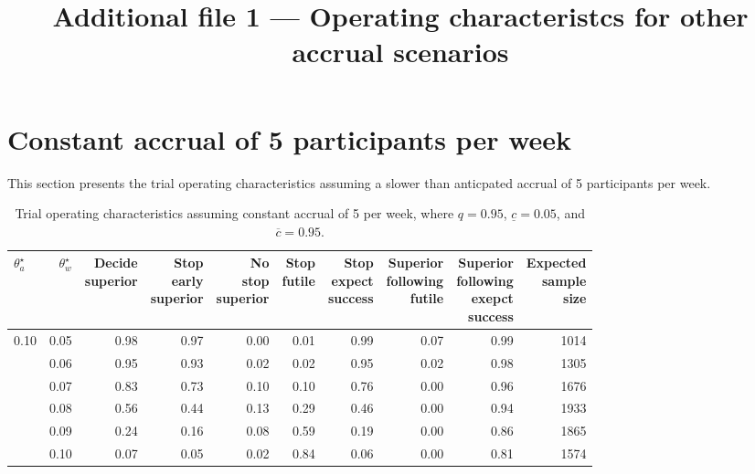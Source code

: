 \documentclass{article}
\title{Additional file 1 --- Operating characteristcs for other accrual scenarios}
\date{}
\begin{document}
\maketitle

\section{Constant accrual of 5 participants per week}

This section presents the trial operating characteristics assuming a slower than anticpated accrual of 5 participants per week.

\begin{table}[!ht]
	\footnotesize
	\caption{\label{tab:oc1}Trial operating characteristics assuming constant accrual of 5 per week, where $q=0.95$, $\underline{c}=0.05$, and $\overline{c}=0.95$.}
	\centering
	\begin{tabular}[t]{lrrrrrrrrr}
	\toprule
	$\theta_a^\star$ & $\theta_w^\star$ & \makecell{Decide\\superior} & \makecell{Stop\\early\\superior} & \makecell{No\\stop\\superior} & \makecell{Stop\\futile} & \makecell{Stop\\expect\\success} & \makecell{Superior\\following\\futile} & \makecell{Superior\\following\\exepct\\success} & \makecell{Expected\\sample\\size}\\
	\midrule
	0.10 & 0.05 & 0.98 & 0.97 & 0.00 & 0.01 & 0.99 & 0.07 & 0.99 & 1014\\
	     & 0.06 & 0.95 & 0.93 & 0.02 & 0.02 & 0.95 & 0.02 & 0.98 & 1305\\
	     & 0.07 & 0.83 & 0.73 & 0.10 & 0.10 & 0.76 & 0.00 & 0.96 & 1676\\
	     & 0.08 & 0.56 & 0.44 & 0.13 & 0.29 & 0.46 & 0.00 & 0.94 & 1933\\
	     & 0.09 & 0.24 & 0.16 & 0.08 & 0.59 & 0.19 & 0.00 & 0.86 & 1865\\
	     & 0.10 & 0.07 & 0.05 & 0.02 & 0.84 & 0.06 & 0.00 & 0.81 & 1574\\
	\bottomrule
	\end{tabular}
\end{table}
\end{document}
